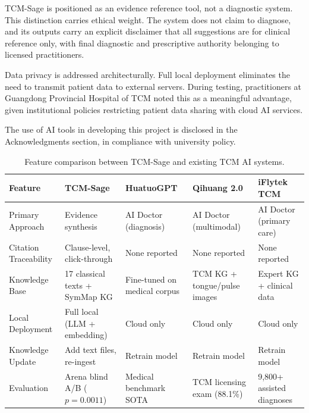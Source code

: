 TCM-Sage is positioned as an evidence reference tool, not a diagnostic system. This distinction carries ethical weight. The system does not claim to diagnose, and its outputs carry an explicit disclaimer that all suggestions are for clinical reference only, with final diagnostic and prescriptive authority belonging to licensed practitioners.

Data privacy is addressed architecturally. Full local deployment eliminates the need to transmit patient data to external servers. During testing, practitioners at Guangdong Provincial Hospital of TCM noted this as a meaningful advantage, given institutional policies restricting patient data sharing with cloud AI services.

The use of AI tools in developing this project is disclosed in the Acknowledgments section, in compliance with university policy.

\begin{table}[H]
\centering
\caption{Feature comparison between TCM-Sage and existing TCM AI systems.}
\label{tab:comparison}
\begin{tabularx}{\textwidth}{lXXXX}
\toprule
\textbf{Feature} & \textbf{TCM-Sage} & \textbf{HuatuoGPT} & \textbf{Qihuang 2.0} & \textbf{iFlytek TCM} \\
\midrule
Primary Approach & Evidence synthesis & AI Doctor (diagnosis) & AI Doctor (multimodal) & AI Doctor (primary care) \\
Citation Traceability & Clause-level, click-through & None reported & None reported & None reported \\
Knowledge Base & 17 classical texts + SymMap KG & Fine-tuned on medical corpus & TCM KG + tongue/pulse images & Expert KG + clinical data \\
Local Deployment & Full local (LLM + embedding) & Cloud only & Cloud only & Cloud only \\
Knowledge Update & Add text files, re-ingest & Retrain model & Retrain model & Retrain model \\
Evaluation & Arena blind A/B ($p=0.0011$) & Medical benchmark SOTA & TCM licensing exam (88.1\%) & 9,800+ assisted diagnoses \\
\bottomrule
\end{tabularx}
\end{table}
